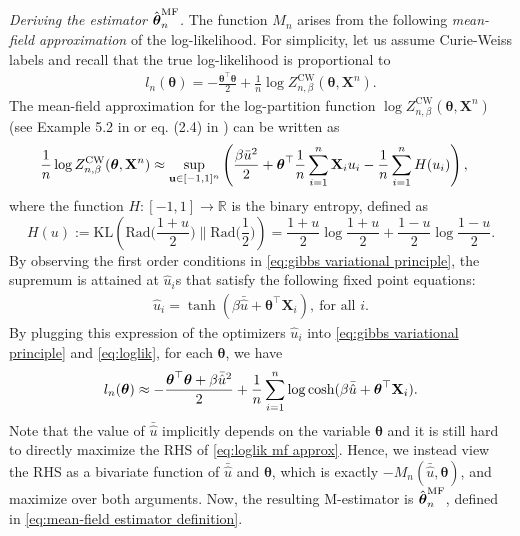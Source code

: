 \documentclass[preprint,reqno]{imsart}
\newcommand{\ttheta}{\boldsymbol{\theta}}
\DeclareMathOperator{\bu}{\textbf{u}}
\newcommand{\X}{\mathbf{X}}
\DeclareMathOperator{\sumin}{\sum_{\mathnormal i=1}^{\mathnormal n}}
\newcommand{\thetamf}{\hat{\boldsymbol \theta}^{\text{MF}}_{\mathnormal n}}
\begin{document}
%
\vspace{2mm}

\noindent \emph{Deriving the estimator $\thetamf$.} The function $M_n$ arises from the following \emph{mean-field approximation} of the log-likelihood. 
For simplicity, let us assume Curie-Weiss labels and recall that the true log-likelihood is proportional to 
\begin{align}\label{eq:loglik}
    l_n(\ttheta) = - \frac{\ttheta^{\top} \ttheta}{2}  + \frac{1}{n} \log Z_{n,\beta}^{\text{CW}}(\ttheta, \X^n).
\end{align}
The mean-field approximation for the log-partition function $\log{Z_{n,\beta}^{\text{CW}}(\ttheta, \X^n)}$ (see Example 5.2 in \cite{wainwright2008graphical} or eq. (2.4) in \cite{lee2024rfim}) can be written as 
\begin{equation}\label{eq:gibbs variational principle}
\begin{aligned}
    \frac{1}{n} \log{Z_{n,\beta}^{\text{CW}}(\ttheta, \X^n)} 
    &\approx \sup_{\bu \in [-1,1]^n} \left(\frac{\beta \bar{u}^2}{2} + \ttheta^\top \frac{1}{n} \sumin \X_i u_i- \frac{1}{n} \sumin H(u_i) \right),
\end{aligned}
\end{equation}
where the function $H:[-1,1]\to \mathbb{R}$ is the binary entropy, defined as
$$H(u) := \mathrm{KL}\left(\text{Rad}\big(\frac{1+u}{2}\big) \|  \text{Rad}\big(\frac{1}{2}\big)\right) = \frac{1+u}{2} \log \frac{1+u}{2} + \frac{1-u}{2} \log \frac{1-u}{2}.$$
%
%
%
%
%
By observing the first order conditions in \eqref{eq:gibbs variational principle}, the supremum is attained at $\hat{u}_i$s that satisfy the following fixed point equations:
\begin{align}\label{eq:fixed point}
    \hat{u}_i = \tanh(\beta \bar{\hat{u}} + \ttheta^\top \X_i), ~ \mbox{for all } i.
\end{align}
%
By plugging this expression of the optimizers $\hat{u}_i$ into \eqref{eq:gibbs variational principle} and \eqref{eq:loglik}, for each $\ttheta$, we have
%
\begin{align}\label{eq:loglik mf approx}
    l_n(\ttheta) \approx - \frac{\ttheta^\top \ttheta+ \beta \bar{\hat{u}}^2}{2} + \frac{1}{n} \sumin \log \cosh(\beta \bar{\hat{u}} + \ttheta^\top \X_i).
\end{align}
Note that the value of $\bar{\hat{u}}$ implicitly depends on the variable $\ttheta$ and it is still hard to directly maximize the RHS of \eqref{eq:loglik mf approx}. Hence, we instead view the RHS as a bivariate function of $\bar{\hat{u}}$ and $\ttheta$, which is exactly $-M_n(\bar{\hat{u}}, \ttheta)$, and maximize over both arguments. Now, the resulting M-estimator is $\thetamf$, defined in \eqref{eq:mean-field estimator definition}.
\end{document}
